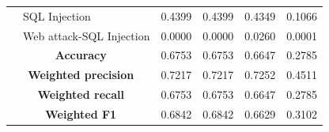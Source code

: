 \begin{table}[htbp]
\begin{tabular}{llcccc}
{{ & SQL Injection & 0.4399 & 0.4399 & 0.4349 & 0.1066 \\
 & Web attack-SQL Injection & 0.0000 & 0.0000 & 0.0260 & 0.0001 \\
\midrule
\multicolumn{2}{c}{\textbf{Accuracy}} & 0.6753 & 0.6753 & 0.6647 & 0.2785 \\
\midrule
\multicolumn{2}{c}{\textbf{Weighted precision}} & 0.7217 & 0.7217 & 0.7252 & 0.4511 \\
\midrule
\multicolumn{2}{c}{\textbf{Weighted recall}} & 0.6753 & 0.6753 & 0.6647 & 0.2785 \\
\midrule
\multicolumn{2}{c}{\textbf{Weighted F1}} & 0.6842 & 0.6842 & 0.6629 & 0.3102 \\
\bottomrule
\end{tabular}
\end{table}
